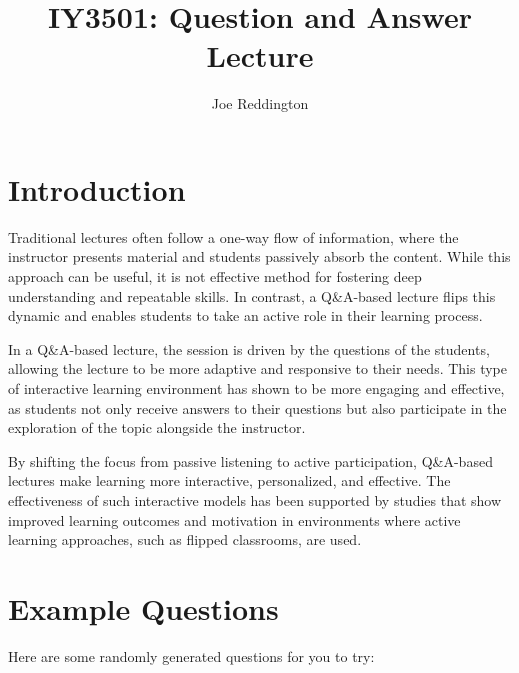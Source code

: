 \documentclass[12pt]{article}
\title{IY3501: Question and Answer Lecture}
\author{Joe Reddington}
\date{}
\begin{document}
\maketitle

\section*{Introduction}

Traditional lectures often follow a one-way flow of information, where the instructor presents material and students passively absorb the content. 
While this approach can be useful, it is not effective method for fostering deep understanding and repeatable skills. In contrast, a Q\&A-based lecture flips this dynamic and enables students to take an active role in their learning process.\cite{reidsema2017flipped} 

In a Q\&A-based lecture, the session is driven by the questions of the students, allowing the lecture to be more adaptive and responsive to their needs. This type of interactive learning environment has shown to be more engaging and effective, as students not only receive answers to their questions but also participate in the exploration of the topic alongside the instructor.\cite{ZhengLanqin2020TEot} 

By shifting the focus from passive listening to active participation, Q\&A-based lectures make learning more interactive, personalized, and effective. The effectiveness of such interactive models has been supported by studies that show improved learning outcomes and motivation in environments where active learning approaches, such as flipped classrooms, are used.\cite{ZhengLanqin2020TEot}

\section{Example Questions} 
Here are some randomly generated questions for you to try: 
\end{document}
